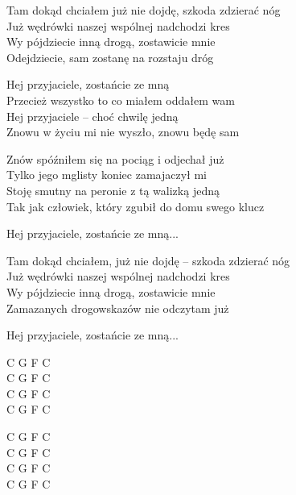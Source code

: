 \begin{text}
    Tam dokąd chciałem już nie dojdę, szkoda zdzierać nóg\\
    Już wędrówki naszej wspólnej nadchodzi kres\\
    Wy pójdziecie inną drogą, zostawicie mnie\\
    Odejdziecie, sam zostanę na rozstaju dróg

    \vin Hej przyjaciele, zostańcie ze mną\\
    \vin Przecież wszystko to co miałem oddałem wam\\
    \vin Hej przyjaciele – choć chwilę jedną\\
    \vin Znowu w życiu mi nie wyszło, znowu będę sam

    Znów spóźniłem się na pociąg i odjechał już\\
    Tylko jego mglisty koniec zamajaczył mi\\
    Stoję smutny na peronie z tą walizką jedną\\
    Tak jak człowiek, który zgubił do domu swego klucz

    \vin Hej przyjaciele, zostańcie ze mną...

    Tam dokąd chciałem, już nie dojdę – szkoda zdzierać nóg\\
    Już wędrówki naszej wspólnej nadchodzi kres\\
    Wy pójdziecie inną drogą, zostawicie mnie\\
    Zamazanych drogowskazów nie odczytam już

    \vin Hej przyjaciele, zostańcie ze mną...
\end{text}
\begin{chord}
    C G F C\\
    C G F C\\
    C G F C\\
    C G F C

    C G F C\\
    C G F C\\
    C G F C\\
    C G F C
\end{chord}